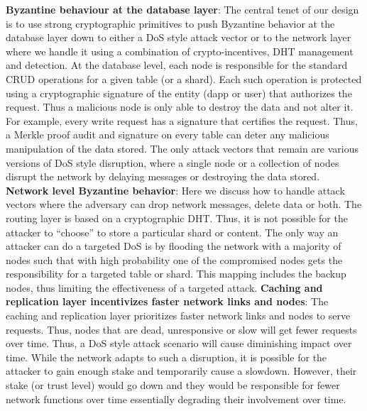 \textbf{Byzantine behaviour at the database layer}: The central tenet of our design is to use strong cryptographic primitives to push Byzantine behavior at the database layer down to either a DoS style attack vector or to the network layer where we handle it using a combination of crypto-incentives, DHT management and detection. At the database level, each node is responsible for the standard CRUD operations for a given table (or a shard). Each such operation is protected using a cryptographic signature of the entity (dapp or user) that authorizes the request. Thus a malicious node is only able to destroy the data and not alter it. For example, every write request has a signature that certifies the request. Thus, a Merkle proof audit and signature on every table can deter any malicious manipulation of the data stored. The only attack vectors that remain are various versions of DoS style disruption, where a single node or a collection of nodes disrupt the network by delaying messages or destroying the data stored. 
\newline\newline
\textbf{Network level Byzantine behavior}: Here we discuss how to handle attack vectors where the adversary can drop network messages, delete data or both. The routing layer is based on a cryptographic DHT. Thus, it is not possible for the attacker to “choose” to store a particular shard or content. The only way an attacker can do a targeted DoS is by flooding the network with a majority of nodes such that with high probability one of the compromised nodes gets the responsibility for a targeted table or shard. This mapping includes the backup nodes, thus limiting the effectiveness of a targeted attack.
\newline\newline
\textbf{Caching and replication layer incentivizes faster network links and nodes}:
The caching and replication layer prioritizes faster network links and nodes to serve requests. Thus, nodes that are dead, unresponsive or slow will get fewer requests over time. Thus, a DoS style attack scenario will cause diminishing impact over time. While the network adapts to such a disruption, it is possible for the attacker to gain enough stake and temporarily cause a slowdown. However, their stake (or trust level) would go down and they would be responsible for fewer network functions over time essentially degrading their involvement over time.	
\newline\newline
